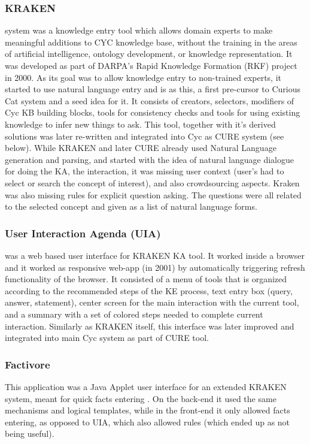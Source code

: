 \subsubsection{KRAKEN} system was a knowledge entry tool which allows domain experts to
make meaningful additions to CYC knowledge base, without the training in the 
areas of artificial intelligence, ontology development, or knowledge
representation\parencite{Panton2002a}. It was developed as part of DARPA's
Rapid Knowledge Formation (RKF) project in 2000. As its goal was to allow
knowledge entry to non-trained experts, it started to use natural language 
entry and is as this, a first pre-cursor to Curious Cat system and a seed idea
for it. It consists of creators, selectors, modifiers of Cyc KB building blocks,
tools for consistency checks and tools for using existing knowledge to infer new
things to ask. This tool, together with it's derived solutions was later 
re-written and integrated into Cyc as CURE system (see below). While KRAKEN and
later CURE already used Natural Language generation and parsing, and started 
with the idea of natural language dialogue for doing the KA, the interaction, it
was missing user context (user's had to select or search the concept of 
interest), and also crowdsourcing aspects. Kraken was also missing rules for
explicit question asking. The questions were all related to the selected concept
and given as a list of natural language forms.

\subsubsection{User Interaction Agenda (UIA)} was a web  based user interface for KRAKEN
KA tool\parencite{Panton2002a,Witbrock2003UIA}. It worked inside a browser and 
it worked as responsive web-app (in 2001) by automatically triggering refresh 
functionality of the browser. It consisted of a menu of tools that is organized
according to the recommended steps of the KE process, text entry box (query, 
answer, statement), center screen for the main interaction with the current 
tool, and a summary with a set of colored steps needed to complete current 
interaction. Similarly as KRAKEN itself, this interface was later improved
and integrated into main Cyc system as part of CURE tool. 

\subsubsection{Factivore} 
This application was a Java Applet user interface for an extended KRAKEN system,
meant for quick facts entering \parencite{Witbrock2005}. On the back-end it used
the same mechanisms and logical templates, while in the front-end it only
allowed facts entering, as opposed to UIA, which also allowed rules (which
ended up as not being useful).

